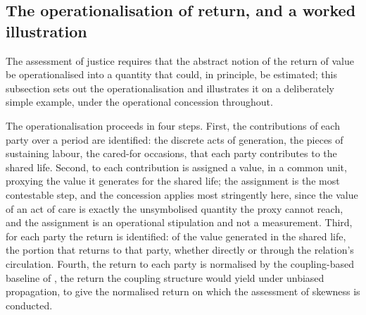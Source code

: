 \subsection{The operationalisation of return, and a worked illustration}
\label{p11:sec:ev-operational}

The assessment of justice requires that the abstract notion of the return of value be operationalised into a quantity that could, in principle, be estimated; this subsection sets out the operationalisation and illustrates it on a deliberately simple example, under the operational concession throughout.

The operationalisation proceeds in four steps. First, the contributions of each party over a period are identified: the discrete acts of generation, the pieces of sustaining labour, the cared-for occasions, that each party contributes to the shared life. Second, to each contribution is assigned a value, in a common unit, proxying the value it generates for the shared life; the assignment is the most contestable step, and the concession applies most stringently here, since the value of an act of care is exactly the unsymbolised quantity the proxy cannot reach, and the assignment is an operational stipulation and not a measurement. Third, for each party the return is identified: of the value generated in the shared life, the portion that returns to that party, whether directly or through the relation's circulation. Fourth, the return to each party is normalised by the coupling-based baseline of , the return the coupling structure would yield under unbiased propagation, to give the normalised return on which the assessment of skewness is conducted.

